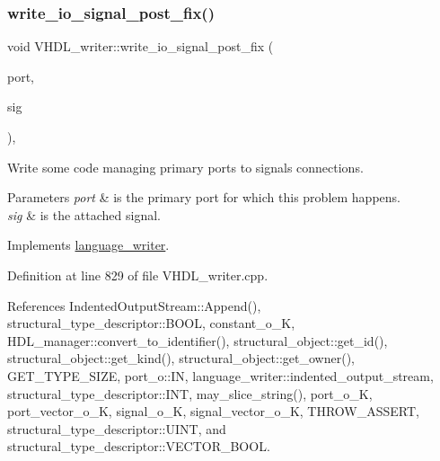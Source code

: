 \subsubsection{\texorpdfstring{write\+\_\+io\+\_\+signal\+\_\+post\+\_\+fix()}{write\_io\_signal\_post\_fix()}}
{\footnotesize\ttfamily void V\+H\+D\+L\+\_\+writer\+::write\+\_\+io\+\_\+signal\+\_\+post\+\_\+fix (\begin{DoxyParamCaption}\item[{const \hyperlink{structural__objects_8hpp_a8ea5f8cc50ab8f4c31e2751074ff60b2}{structural\+\_\+object\+Ref} \&}]{port,  }\item[{const \hyperlink{structural__objects_8hpp_a8ea5f8cc50ab8f4c31e2751074ff60b2}{structural\+\_\+object\+Ref} \&}]{sig }\end{DoxyParamCaption})\hspace{0.3cm}{\ttfamily [override]}, {\ttfamily [virtual]}}



Write some code managing primary ports to signals connections. 


\begin{DoxyParams}{Parameters}
{\em port} & is the primary port for which this problem happens. \\
\hline
{\em sig} & is the attached signal. \\
\hline
\end{DoxyParams}


Implements \hyperlink{classlanguage__writer_a1789bbe12e4b1e4f168f4cc25bb7faff}{language\+\_\+writer}.



Definition at line 829 of file V\+H\+D\+L\+\_\+writer.\+cpp.



References Indented\+Output\+Stream\+::\+Append(), structural\+\_\+type\+\_\+descriptor\+::\+B\+O\+OL, constant\+\_\+o\+\_\+K, H\+D\+L\+\_\+manager\+::convert\+\_\+to\+\_\+identifier(), structural\+\_\+object\+::get\+\_\+id(), structural\+\_\+object\+::get\+\_\+kind(), structural\+\_\+object\+::get\+\_\+owner(), G\+E\+T\+\_\+\+T\+Y\+P\+E\+\_\+\+S\+I\+ZE, port\+\_\+o\+::\+IN, language\+\_\+writer\+::indented\+\_\+output\+\_\+stream, structural\+\_\+type\+\_\+descriptor\+::\+I\+NT, may\+\_\+slice\+\_\+string(), port\+\_\+o\+\_\+K, port\+\_\+vector\+\_\+o\+\_\+K, signal\+\_\+o\+\_\+K, signal\+\_\+vector\+\_\+o\+\_\+K, T\+H\+R\+O\+W\+\_\+\+A\+S\+S\+E\+RT, structural\+\_\+type\+\_\+descriptor\+::\+U\+I\+NT, and structural\+\_\+type\+\_\+descriptor\+::\+V\+E\+C\+T\+O\+R\+\_\+\+B\+O\+OL.



